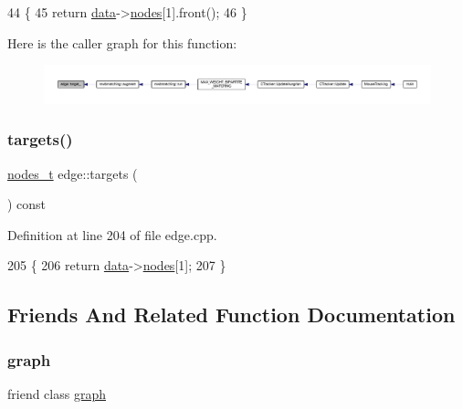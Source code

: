 \begin{DoxyCode}
44 \{
45     \textcolor{keywordflow}{return} \mbox{\hyperlink{classedge_a0ebb6dfa28b77f47529085049352b436}{data}}->\mbox{\hyperlink{classedge__data_a870bbbb05de6c5f63d434db624c55dd4}{nodes}}[1].front();
46 \}
\end{DoxyCode}
Here is the caller graph for this function\+:\nopagebreak
\begin{figure}[H]
\begin{center}
\leavevmode
\includegraphics[width=350pt]{classedge_aa8e46723982d3e630377fb75669711de_icgraph}
\end{center}
\end{figure}
\mbox{\label{classedge_a0bdfb4ca94e3df982b0a0dd91b9ce514}} 
\subsubsection{\texorpdfstring{targets()}{targets()}}
{\footnotesize\ttfamily \mbox{\hyperlink{edge_8h_a22ac17689106ba21a84e7bc54d1199d6}{nodes\+\_\+t}} edge\+::targets (\begin{DoxyParamCaption}{ }\end{DoxyParamCaption}) const}



Definition at line 204 of file edge.\+cpp.


\begin{DoxyCode}
205 \{
206     \textcolor{keywordflow}{return} \mbox{\hyperlink{classedge_a0ebb6dfa28b77f47529085049352b436}{data}}->\mbox{\hyperlink{classedge__data_a870bbbb05de6c5f63d434db624c55dd4}{nodes}}[1];
207 \}
\end{DoxyCode}


\subsection{Friends And Related Function Documentation}
\mbox{\label{classedge_ab8b0dbc1b36724e5e4635ac651c218cb}} 
\subsubsection{\texorpdfstring{graph}{graph}}
{\footnotesize\ttfamily friend class \mbox{\hyperlink{classgraph}{graph}}\hspace{0.3cm}{\ttfamily [friend]}}



